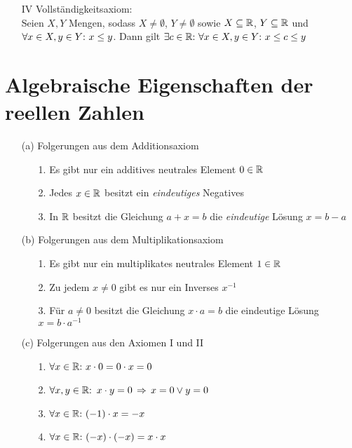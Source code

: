 \begin{enumerate}
		\item [IV] Vollständigkeitsaxiom:\\
		Seien $X,Y$ Mengen, sodass $X \neq \emptyset$, $Y \neq \emptyset$ sowie $X \subseteq \mathbb{R}$, $Y \subseteq \mathbb{R}$ und $\forall x \in X, y \in Y{:}\  x \leq y$. Dann gilt $\exists c \in \mathbb{R}{:}\  \forall x \in X, y \in Y{:}\  x \leq c \leq y$
	
	\end{enumerate}


\section{Algebraische Eigenschaften der reellen Zahlen}

\begin{enumerate}
	\item[(a)] Folgerungen aus dem Additionsaxiom
	
	\begin{enumerate}
		\item[1.] Es gibt nur ein additives neutrales Element $0 \in \mathbb{R}$
		\item[2.] Jedes $x \in \mathbb{R}$ besitzt ein \textit{eindeutiges} Negatives
		\item[3.] In $\mathbb{R}$ besitzt die Gleichung $a+x = b$ die \textit{eindeutige} Lösung $x= b-a$
	\end{enumerate}
	
	\item[(b)] Folgerungen aus dem Multiplikationsaxiom
	
	\begin{enumerate}
		\item[1.] Es gibt nur ein multiplikates neutrales Element $1 \in \mathbb{R}$
		\item[2.] Zu jedem $x \neq 0$ gibt es nur ein Inverses $x^{-1}$
		\item[3.] Für $a \neq 0$ besitzt die Gleichung $x \cdot a = b$ die eindeutige Lösung $x = b \cdot a^{-1}$
	\end{enumerate}
	
	\item[(c)] Folgerungen aus den Axiomen I und II
	
	\begin{enumerate}
		\item[1.] $\forall x \in \mathbb{R}{:}\  x\cdot 0 = 0 \cdot x = 0$
		\item[2.] $\forall x,y \in \mathbb{R}{:}\  \, x\cdot y = 0 \,\Rightarrow\, x = 0 \lor y = 0$
		\item[3.] $\forall x \in \mathbb{R}{:}\  (-1)\cdot x = -x$
		\item[4.] $\forall x \in \mathbb{R}{:}\  (-x)\cdot (-x) = x\cdot x$
	\end{enumerate}
	

\end{enumerate}
